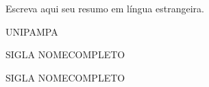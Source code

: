 \documentclass[csgeo,tcc]{unipampa}
\begin{document}
	\begin{englishabstract}
		Escreva aqui seu resumo em língua estrangeira.
	\end{englishabstract}









\listoffigures
\listoftables














\begin{listofabbrv}{UNIPAMPA}
        
        \item[SIGLA]{NOMECOMPLETO}        
        \item[SIGLA]{NOMECOMPLETO}         
      
\end{listofabbrv}







\end{document}
